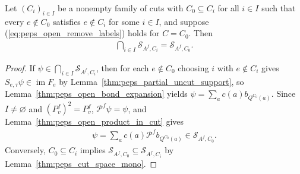 \begin{lemma}%
    \label{thm:peps_partial_open_cut_intersection}
    \leanok
    Let $(C_i)_{i\in I}$ be a nonempty family of cuts with $C_0\subseteq C_i$
    for all $i\in I$ such that every $e\notin C_0$ satisfies $e\notin C_i$ for
    some $i\in I$, and suppose (\ref{eq:peps_open_remove_labels}) holds for
    $C=C_0$. Then
    \begin{align}
        \bigcap_{i\in I}\mathcal S_{A^f,C_i}
        =\mathcal S_{A^f,C_0}.
        \label{eq:peps_partial_open_intersection}
    \end{align}
\end{lemma}
\begin{proof}\leanok
    If $\psi\in\bigcap_{i\in I}\mathcal S_{A^f,C_i}$, then for each $e\notin C_0$
    choosing $i$ with $e\notin C_i$ gives $S_{e,\tau}\psi\in\operatorname{im}F_e$
    by Lemma~\ref{thm:peps_partial_uncut_support}, so
    Lemma~\ref{thm:peps_open_bond_expansion} yields
    $\psi=\sum_a c(a)b_{Q^{C_0}(a)}$. Since $I\ne\varnothing$ and
    $(P_v^f)^2=P_v^f$, $\mathcal P^f\psi=\psi$, and
    Lemma~\ref{thm:peps_open_product_in_cut} gives
    \begin{align}
        \psi=\sum_a c(a)\mathcal P^f b_{Q^{C_0}(a)}
        \in\mathcal S_{A^f,C_0}.
        \label{eq:peps_partial_projected_sum}
    \end{align}
    Conversely, $C_0\subseteq C_i$ implies
    $\mathcal S_{A^f,C_0}\subseteq\mathcal S_{A^f,C_i}$ by
    Lemma~\ref{thm:peps_cut_space_mono}.
\end{proof}

